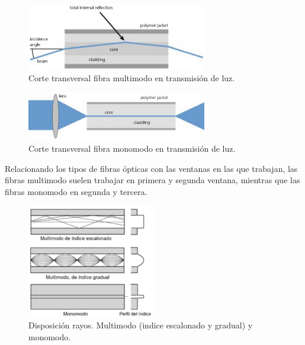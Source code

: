    	\begin{figure}[H]
		\centering
		\includegraphics[width=0.7\textwidth]{./img/guiaMM}
		\caption{Corte transversal fibra multimodo en transmisión de luz. \cite{imgMonoMulti} } 
		\label{fig:guiaMM}
	\end{figure} 
  	\begin{figure}[H]
		\centering
		\includegraphics[width=0.7\textwidth]{./img/guiaSM}
		\caption{Corte transversal fibra monomodo en transmisión de luz. \cite{imgMonoMulti} } 
		\label{fig:guiaSM}
	\end{figure}  
 	
 	Relacionando los tipos de fibras ópticas con las ventanas en las que trabajan, las fibras multimodo suelen trabajar en primera y segunda ventana, mientras que las fibras monomodo en segunda y tercera. 

	  	\begin{figure}[H]
		\centering
		\includegraphics[width=0.5\textwidth]{./img/transFO-esc-grad}
		\caption{Disposición rayos. Multimodo (indice escalonado y gradual) y monomodo. \cite{FOA} } 
		\label{fig:indiceMultimodo}
		\end{figure}
	

